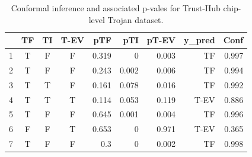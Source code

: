 \begin{table}[t]
\centering
\caption{Conformal inference and associated p-vales for Trust-Hub chip-level Trojan dataset.}
\begin{tabular}{lcccrrrrr}
\hline
  & \textbf{TF} & \textbf{TI} & \textbf{T-EV} & \textbf{pTF} & \textbf{pTI} & \textbf{pT-EV} & \textbf{y\_pred} & \textbf{Conf}\\ \hline
1 & T           & F           & F           & 0.319        & 0            & 0.003        & TF  & 0.997             \\ \hline
2 & T           & F           & F           & 0.243        & 0.002        & 0.006        & TF  & 0.994             \\ \hline
3 & T           & T           & F           & 0.161        & 0.078        & 0.016        & TF   & 0.992            \\ \hline
4 & T           & T           & T           & 0.114        & 0.053        & 0.119        & T-EV  & 0.886           \\ \hline
5 & T           & F           & F           & 0.645        & 0.001        & 0.004            & TF   & 0.996           \\ \hline
6 & F           & F           & T           & 0.653            & 0            & 0.971        & T-EV    & 0.365         \\ \hline
7 & T           & F           & F           & 0.3          & 0            & 0.002        & TF      & 0.998         \\ \hline
\end{tabular}
\label{tab:conformalresults}
\end{table}

